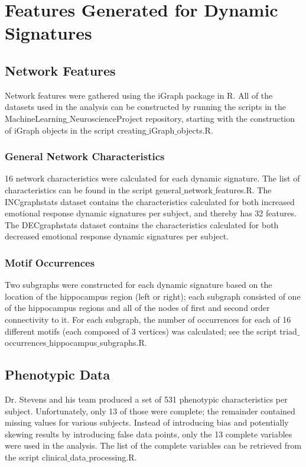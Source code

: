\documentclass[12pt]{report}
\begin{document}
		\section{Features Generated for Dynamic Signatures}
			\subsection{Network Features}
			Network features were gathered using the iGraph package in R. All of the datasets used in the analysis can be constructed by running the scripts in the  MachineLearning$\_$NeuroscienceProject repository, starting with the construction of iGraph objects in the script creating$\_$iGraph$\_$objects.R.
				\subsubsection{General Network Characteristics}
				16 network characteristics were calculated for each dynamic signature. The list of characteristics can be found in the script general$\_$network$\_$features.R. The INCgraphstats dataset contains the characteristics calculated for both increased emotional response dynamic signatures per subject, and thereby has 32 features. The DECgraphstats dataset contains the characteristics calculated for both decreased emotional response dynamic signatures per subject.
			
				\subsubsection{Motif Occurrences}
				Two subgraphs were constructed for each dynamic signature based on the location of the hippocampus region (left or right); each subgraph consisted of one of the hippocampus regions and all of the nodes of first and second order connectivity to it. For each subgraph, the number of occurrences for each of 16 different motifs (each composed of 3 vertices) was calculated; see the script triad$\_$occurrences$\_$hippocampus$\_$subgraphs.R.
			
			\subsection{Phenotypic Data}
			Dr. Stevens and his team produced a set of 531 phenotypic characteristics per subject. Unfortunately, only 13 of those were complete; the remainder contained missing values for various subjects. Instead of introducing bias and potentially skewing results by introducing false data points, only the 13 complete variables were used in the analysis. The list of the complete variables can be retrieved from the script clinical$\_$data$\_$processing.R.
		
\end{document}
